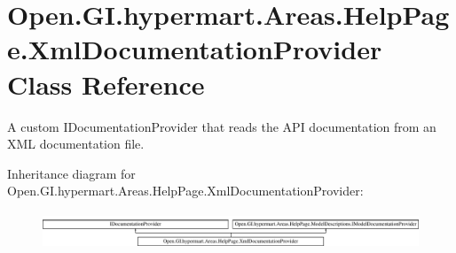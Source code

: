 \hypertarget{class_open_1_1_g_i_1_1hypermart_1_1_areas_1_1_help_page_1_1_xml_documentation_provider}{}\section{Open.\+G\+I.\+hypermart.\+Areas.\+Help\+Page.\+Xml\+Documentation\+Provider Class Reference}
\label{class_open_1_1_g_i_1_1hypermart_1_1_areas_1_1_help_page_1_1_xml_documentation_provider}


A custom I\+Documentation\+Provider that reads the A\+PI documentation from an X\+ML documentation file.  


Inheritance diagram for Open.\+G\+I.\+hypermart.\+Areas.\+Help\+Page.\+Xml\+Documentation\+Provider\+:\begin{figure}[H]
\begin{center}
\leavevmode
\includegraphics[height=1.102362cm]{class_open_1_1_g_i_1_1hypermart_1_1_areas_1_1_help_page_1_1_xml_documentation_provider}
\end{center}
\end{figure}
